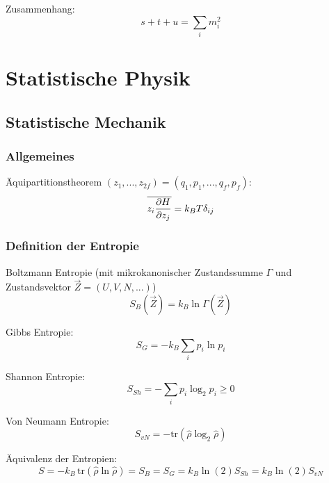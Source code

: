 \documentclass[11pt]{article}
\numberwithin{equation}{section}
\begin{document}
				\noindent
				Zusammenhang:
				\begin{equation}
					s+t+u = \sum_i m_i^2
				\end{equation}




	\newpage
	\section{Statistische Physik}
		\subsection{Statistische Mechanik}
			\subsubsection{Allgemeines}
				\noindent
				Äquipartitionstheorem $(z_1,...,z_{2f}) = (q_1, p_1, ..., q_f, p_f)$:
				\begin{equation}
					\overline{ z_i \frac{\partial H}{\partial z_j}} = k_B T \delta_{ij}
				\end{equation}

			\subsubsection{Definition der Entropie}
				\noindent
				Boltzmann Entropie (mit mikrokanonischer Zustandssumme $\Gamma$ und Zustandsvektor $\vec{Z}=(U,V,N,...)$)
				\begin{equation}
					S_{B}(\vec{Z}) = k_B \ln\Gamma(\vec{Z})
				\end{equation}

				\noindent
				Gibbs Entropie:
				\begin{equation}
					S_{G} = -k_B \sum_i p_i \ln p_i
				\end{equation}

				\noindent
				Shannon Entropie:
				\begin{equation}
					S_{Sh} = -\sum_i p_i\log_2{p_i} \ge 0
				\end{equation}

				\noindent
				Von Neumann Entropie:
				\begin{equation}
					S_{vN} = -\mathrm{tr}(\hat{\rho}\log_2\hat{\rho})
				\end{equation}

				\noindent
				Äquivalenz der Entropien:
				\begin{equation}
					S = -k_B\,\mathrm{tr}(\hat{\rho} \ln \hat{\rho}) = S_B = S_G = k_B\ln(2) S_{Sh} = k_B\ln(2) S_{vN}
				\end{equation}
\end{document}
